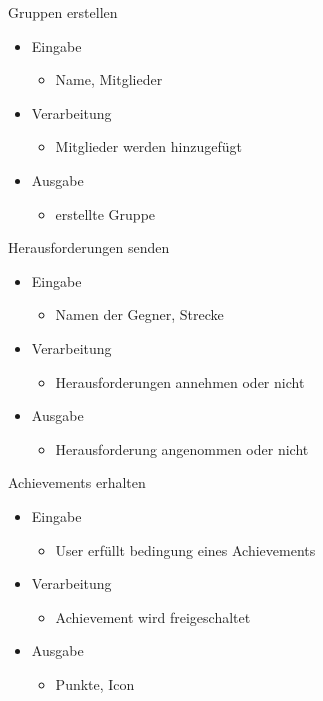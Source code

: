 \documentclass[a4paper, 12pt]{article}
\begin{document}
\bigskip
{\Large Gruppen erstellen}\\
\begin{itemize}
\item Eingabe
	\begin{itemize}
	\item Name, Mitglieder
	\end{itemize}
\item Verarbeitung
	\begin{itemize}
	\item Mitglieder werden hinzugefügt
	\end{itemize}
\item Ausgabe
	\begin{itemize}
	\item erstellte Gruppe
	\end{itemize}
\end{itemize}

\bigskip
{\Large Herausforderungen senden}\\
\begin{itemize}
\item Eingabe
	\begin{itemize}
	\item Namen der Gegner, Strecke
	\end{itemize}
\item Verarbeitung
	\begin{itemize}
	\item Herausforderungen annehmen oder nicht
	\end{itemize}
\item Ausgabe
	\begin{itemize}
	\item Herausforderung angenommen oder nicht
	\end{itemize}
\end{itemize}

\bigskip
{\Large Achievements erhalten}\\
\begin{itemize}
\item Eingabe
	\begin{itemize}
	\item User erfüllt bedingung eines Achievements
	\end{itemize}
\item Verarbeitung
	\begin{itemize}
	\item Achievement wird freigeschaltet
	\end{itemize}
\item Ausgabe
	\begin{itemize}
	\item Punkte, Icon
	\end{itemize}
\end{itemize}
\end{document}
